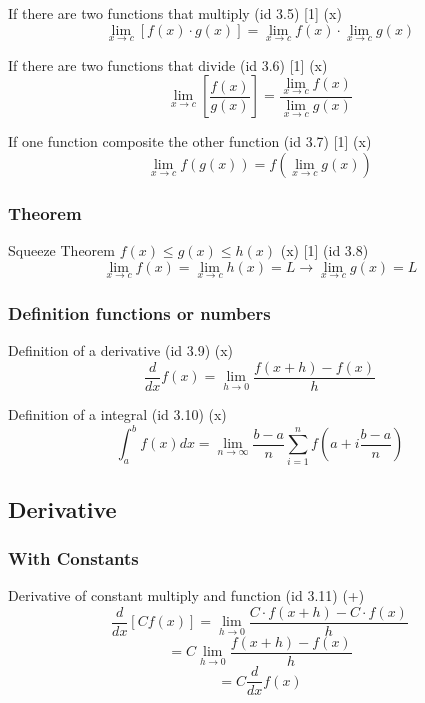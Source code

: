 \documentclass{book}
\begin{document}
                    If there are two functions that multiply (id 3.5) [1] (x)
                    \[\lim_{x \rightarrow c} [f(x) \cdot g(x)] = \lim_{x \rightarrow c} f(x) \cdot \lim_{x \rightarrow c} g(x)\]
    
                    If there are two functions that divide (id 3.6) [1] (x)
                    \[\lim_{x \rightarrow c} \left[\frac{f(x)}{g(x)}\right] = \frac{\lim_{x \rightarrow c} f(x)}{\lim_{x \rightarrow c} g(x)}\]
    
                    If one function composite the other function (id 3.7) [1] (x)
                    \[\lim_{x \rightarrow c} f(g(x)) = f(\lim_{x \rightarrow c} g(x))\]                   

                \subsubsection{Theorem}
                    Squeeze Theorem $f(x) \leq g(x) \leq h(x)$ (x) [1] (id 3.8)
                    \[\lim_{x \rightarrow c} f(x) = \lim_{x \rightarrow c} h(x) = L \rightarrow \lim_{x \rightarrow c} g(x) = L\]

                \subsubsection{Definition functions or numbers}
                
                    Definition of a derivative (id 3.9) (x)
                    \[\frac{d}{dx} f(x) = \lim_{h \rightarrow 0} \frac{f(x + h) - f(x)}{h}\]

                    Definition of a integral (id 3.10) (x)
                    \[\int^b_a f(x) dx = \lim_{n \rightarrow \infty} \frac{b - a}{n} \sum^n_{i=1} f\left(a + i \frac{b - a}{n}\right)\]
        
            \subsection{Derivative}
                \subsubsection{With Constants}
                    Derivative of constant multiply and function (id 3.11) (+)
                    \[\frac{d}{dx} [C f(x)] = \lim_{h \rightarrow 0} \frac{C \cdot f(x + h) - C \cdot f(x)}{h}\]
                    \[= C \lim_{h \rightarrow 0} \frac{f(x + h) - f(x)}{h}\]
                    \[= C \frac{d}{dx} f(x)\]
\end{document}
